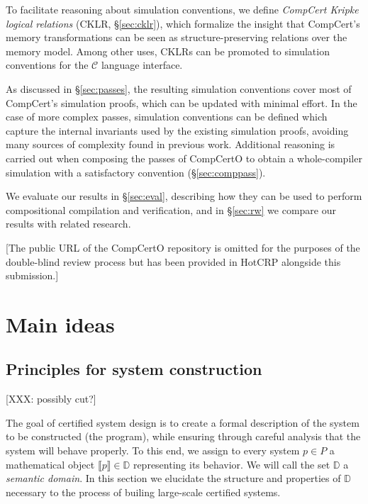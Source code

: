 \documentclass[acmsmall,authordraft]{acmart}
\begin{document}
To facilitate reasoning about
simulation conventions,
we define \emph{CompCert Kripke logical relations}
(CKLR, \S\ref{sec:cklr}),
which formalize the insight that
CompCert's memory transformations can be seen
as structure-preserving relations
over the memory model.
Among other uses,
CKLRs can be promoted to
simulation conventions for the $\mathcal{C}$
language interface.

As discussed in \S\ref{sec:passes},
the resulting simulation conventions
cover most of CompCert's simulation proofs,
which can be updated with minimal effort.
In the case of more complex passes,
simulation conventions can be defined
which capture the internal invariants
used by the existing simulation proofs,
avoiding many sources of complexity found
in previous work.
Additional reasoning is carried out
when composing the passes of CompCertO
to obtain a whole-compiler simulation
with a satisfactory convention (\S\ref{sec:comppass}).

We evaluate our results in \S\ref{sec:eval},
describing how they
can be used to perform compositional compilation and verification,
and in \S\ref{sec:rw} we compare our results with related research.

[The public URL of the CompCertO repository is omitted
for the purposes of the double-blind review process
but has been provided in HotCRP alongside this submission.]



\section{Main ideas} \label{sec:mainideas} %

\subsection{Principles for system construction} \label{sec:principles} %

[XXX: possibly cut?]


The goal of certified system design is
to create a formal description of
the system to be constructed (the program),
while ensuring
through careful analysis
that the system
will behave properly.
To this end,
we assign
to every system $p \in P$
a mathematical object $\llbracket p \rrbracket \in \mathbb{D}$
representing its behavior.
We will call the set $\mathbb{D}$ a \emph{semantic domain}.
In this section we elucidate
the structure and properties of $\mathbb{D}$
necessary to the process of builing
large-scale certified systems.
\end{document}
